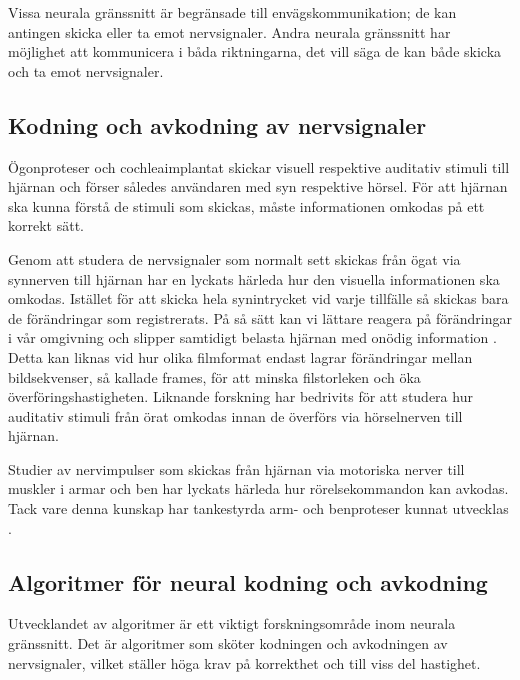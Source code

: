 \documentclass[12pt, a4paper]{article}
\begin{document}
Vissa neurala gränssnitt är begränsade till envägskommunikation; de kan antingen skicka eller ta emot nervsignaler. Andra neurala gränssnitt har möjlighet att kommunicera i båda riktningarna, det vill säga de kan både skicka och ta emot nervsignaler.


\subsection{Kodning och avkodning av nervsignaler}
\label{enc_dec}

Ögonproteser \cite{sight2} och cochleaimplantat \cite{sound} skickar visuell respektive auditativ stimuli till hjärnan och förser således användaren med syn respektive hörsel. För att hjärnan ska kunna förstå de stimuli som skickas, måste informationen omkodas på ett korrekt sätt.

Genom att studera de nervsignaler som normalt sett skickas från ögat via synnerven till hjärnan har en lyckats härleda hur den visuella informationen ska omkodas. Istället för att skicka hela synintrycket vid varje tillfälle så skickas bara de förändringar som registrerats. På så sätt kan vi lättare reagera på förändringar i vår omgivning och slipper samtidigt belasta hjärnan med onödig information \cite{sight1}. Detta kan liknas vid hur olika filmformat endast lagrar förändringar mellan bildsekvenser, så kallade frames, för att minska filstorleken och öka överföringshastigheten. Liknande forskning har bedrivits för att studera hur auditativ stimuli från örat omkodas innan de överförs via hörselnerven till hjärnan.

Studier av nervimpulser som skickas från hjärnan via motoriska nerver till muskler i armar och ben har lyckats härleda hur rörelsekommandon kan avkodas. Tack vare denna kunskap har tankestyrda arm- och benproteser kunnat utvecklas \cite{prosthetic_operation}.


\subsection{Algoritmer för neural kodning och avkodning}

Utvecklandet av algoritmer är ett viktigt forskningsområde inom neurala gränssnitt. Det är algoritmer som sköter kodningen och avkodningen av nervsignaler, vilket ställer höga krav på korrekthet och till viss del hastighet.
\end{document}
